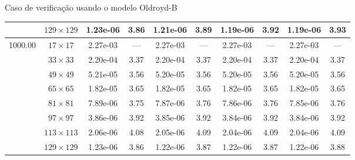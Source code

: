 \begin{frame}{Caso de verificação usando o modelo Oldroyd-B}
\begin{table}[H]
{\begin{tabular*}{\textwidth}{@{\extracolsep\fill}cccccccccc@{}}
    & $129\times 129$ & 1.23e-06 & 3.86 & 1.21e-06 & 3.89 & 1.19e-06 & 3.92 & 1.19e-06 & 3.93 \\
    \hline\hline
    \multirow{7}{*}{1000.00} & $17\times 17$ & 2.27e-03 & --- & 2.27e-03 & --- & 2.27e-03 & --- & 2.27e-03 & --- \\
    & $33\times 33$ & 2.20e-04 & 3.37 & 2.20e-04 & 3.37 & 2.20e-04 & 3.37 & 2.20e-04 & 3.37 \\
    & $49\times 49$ & 5.21e-05 & 3.56 & 5.20e-05 & 3.56 & 5.20e-05 & 3.56 & 5.20e-05 & 3.56 \\
    & $65\times 65$ & 1.82e-05 & 3.65 & 1.82e-05 & 3.65 & 1.82e-05 & 3.65 & 1.82e-05 & 3.65 \\
    & $81\times 81$ & 7.89e-06 & 3.75 & 7.87e-06 & 3.76 & 7.86e-06 & 3.76 & 7.85e-06 & 3.76 \\
    & $97\times 97$ & 3.86e-06 & 3.92 & 3.85e-06 & 3.92 & 3.84e-06 & 3.92 & 3.84e-06 & 3.92 \\
    & $113\times 113$ & 2.06e-06 & 4.08 & 2.05e-06 & 4.09 & 2.04e-06 & 4.09 & 2.04e-06 & 4.09 \\
    & $129\times 129$ & 1.23e-06 & 3.86 & 1.22e-06 & 3.87 & 1.22e-06 & 3.87 & 1.22e-06 & 3.88 \\
    \hline
    \end{tabular*}
}
\end{table}
\end{frame}

